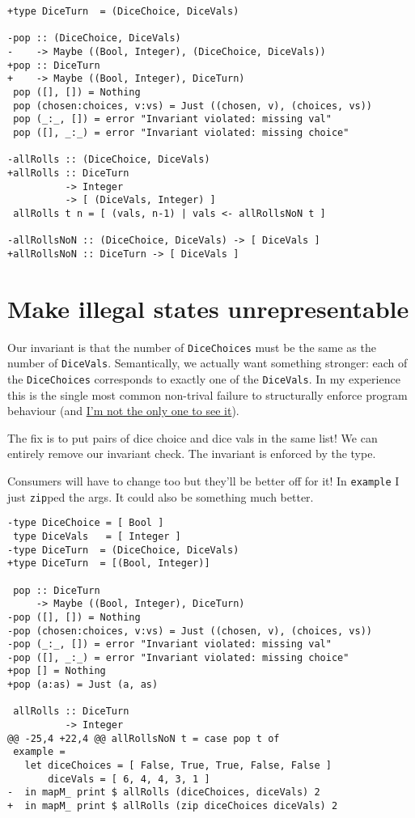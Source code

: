 \begin{verbatim}
+type DiceTurn  = (DiceChoice, DiceVals)

-pop :: (DiceChoice, DiceVals)
-    -> Maybe ((Bool, Integer), (DiceChoice, DiceVals))
+pop :: DiceTurn
+    -> Maybe ((Bool, Integer), DiceTurn)
 pop ([], []) = Nothing
 pop (chosen:choices, v:vs) = Just ((chosen, v), (choices, vs))
 pop (_:_, []) = error "Invariant violated: missing val"
 pop ([], _:_) = error "Invariant violated: missing choice"

-allRolls :: (DiceChoice, DiceVals)
+allRolls :: DiceTurn
          -> Integer
          -> [ (DiceVals, Integer) ]
 allRolls t n = [ (vals, n-1) | vals <- allRollsNoN t ]

-allRollsNoN :: (DiceChoice, DiceVals) -> [ DiceVals ]
+allRollsNoN :: DiceTurn -> [ DiceVals ]
\end{verbatim}


\section{Make illegal states unrepresentable}


Our invariant is that the number of \texttt{DiceChoices} must be the same as the number of \texttt{DiceVals}. Semantically, we actually want something stronger: each of the \texttt{DiceChoices} corresponds to exactly one of the \texttt{DiceVals}. In my experience this is the single most common non-trival failure to structurally enforce program behaviour (and \href{https://twitter.com/fried_brice/status/1178140883633479680}{I'm not the only one to see it}).

The fix is to put pairs of dice choice and dice vals in the same list! We can entirely remove our invariant check. The invariant is enforced by the type.

Consumers will have to change too but they'll be better off for it! In \texttt{example} I just \texttt{zip}ped the args. It could also be something much better.

\begin{verbatim}
-type DiceChoice = [ Bool ]
 type DiceVals   = [ Integer ]
-type DiceTurn  = (DiceChoice, DiceVals)
+type DiceTurn  = [(Bool, Integer)]

 pop :: DiceTurn
     -> Maybe ((Bool, Integer), DiceTurn)
-pop ([], []) = Nothing
-pop (chosen:choices, v:vs) = Just ((chosen, v), (choices, vs))
-pop (_:_, []) = error "Invariant violated: missing val"
-pop ([], _:_) = error "Invariant violated: missing choice"
+pop [] = Nothing
+pop (a:as) = Just (a, as)

 allRolls :: DiceTurn
          -> Integer
@@ -25,4 +22,4 @@ allRollsNoN t = case pop t of
 example =
   let diceChoices = [ False, True, True, False, False ]
       diceVals = [ 6, 4, 4, 3, 1 ]
-  in mapM_ print $ allRolls (diceChoices, diceVals) 2
+  in mapM_ print $ allRolls (zip diceChoices diceVals) 2
\end{verbatim}

